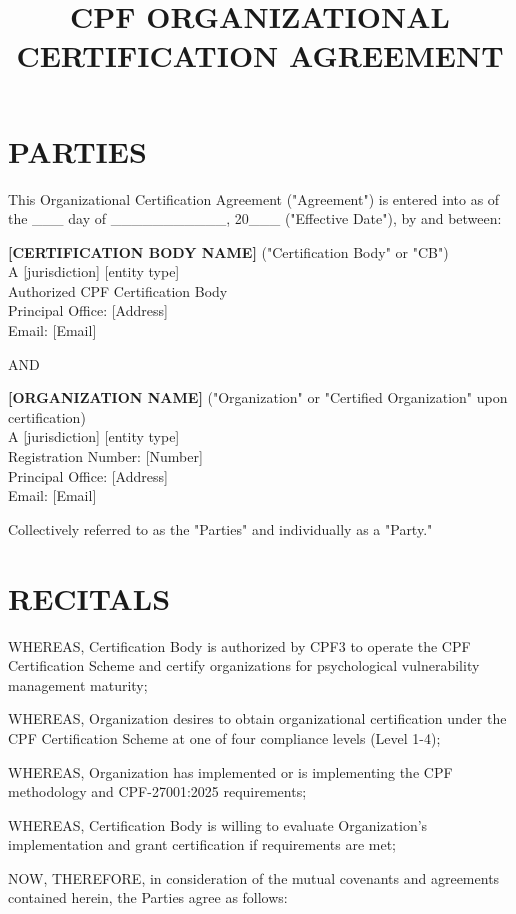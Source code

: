 \documentclass[11pt,a4paper]{article}
\title{\textbf{CPF ORGANIZATIONAL\\CERTIFICATION AGREEMENT}}
\author{}
\date{}
\begin{document}
\maketitle

\section*{PARTIES}

This Organizational Certification Agreement ("Agreement") is entered into as of the \_\_\_ day of \_\_\_\_\_\_\_\_\_\_\_, 20\_\_\_ ("Effective Date"), by and between:

\textbf{[CERTIFICATION BODY NAME]} ("Certification Body" or "CB")\\
A [jurisdiction] [entity type]\\
Authorized CPF Certification Body\\
Principal Office: [Address]\\
Email: [Email]

AND

\textbf{[ORGANIZATION NAME]} ("Organization" or "Certified Organization" upon certification)\\
A [jurisdiction] [entity type]\\
Registration Number: [Number]\\
Principal Office: [Address]\\
Email: [Email]

Collectively referred to as the "Parties" and individually as a "Party."

\section*{RECITALS}

WHEREAS, Certification Body is authorized by CPF3 to operate the CPF Certification Scheme and certify organizations for psychological vulnerability management maturity;

WHEREAS, Organization desires to obtain organizational certification under the CPF Certification Scheme at one of four compliance levels (Level 1-4);

WHEREAS, Organization has implemented or is implementing the CPF methodology and CPF-27001:2025 requirements;

WHEREAS, Certification Body is willing to evaluate Organization's implementation and grant certification if requirements are met;

NOW, THEREFORE, in consideration of the mutual covenants and agreements contained herein, the Parties agree as follows:
\end{document}
